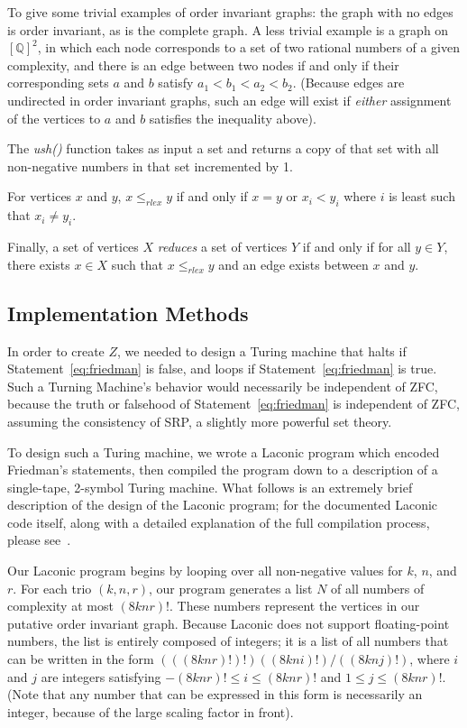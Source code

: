 \documentclass[11pt]{article}
\begin{document}
To give some trivial examples of order invariant graphs: the graph with no edges is order invariant, as is the complete graph. A less trivial example is a graph on $[\mathbb{Q}]^2$, in which each node corresponds to a set of two rational numbers of a given complexity, and there is an edge between two nodes if and only if their corresponding sets $a$ and $b$ satisfy $a_1 < b_1 < a_2 < b_2$. (Because edges are undirected in order invariant graphs, such an edge will exist if \emph{either} assignment of the vertices to $a$ and $b$ satisfies the inequality above). 

The \emph{ush()} function takes as input a set and returns a copy of that set with all non-negative numbers in that set incremented by 1. 

For vertices $x$ and $y$, $x \le_{rlex} y$ if and only if $x = y$ or $x_i < y_i$ where $i$ is least such that $x_i \not= y_i$.

Finally, a set of vertices $X$ \emph{reduces} a set of vertices $Y$ if and only if for all $y \in Y$, there exists $x \in X$ such that $x \le_{rlex} y$ and an edge exists between $x$ and $y$. 

\subsection{Implementation Methods}

In order to create $Z$, we needed to design a Turing machine that halts if Statement~\ref{eq:friedman} is false, and loops if Statement~\ref{eq:friedman} is true. Such a Turning Machine's behavior would necessarily be independent of ZFC, because the truth or falsehood of Statement~\ref{eq:friedman} is independent of ZFC, assuming the consistency of SRP, a slightly more powerful set theory.~\cite{friedman} 

To design such a Turing machine, we wrote a Laconic program which encoded Friedman's statements, then compiled the program down to a description of a single-tape, 2-symbol Turing machine. What follows is an extremely brief description of the design of the Laconic program; for the documented Laconic code itself, along with a detailed explanation of the full compilation process, please see~\cite{github}. 

Our Laconic program begins by looping over all non-negative values for $k$, $n$, and $r$. For each trio $(k, n, r)$, our program generates a list $N$ of all numbers of complexity at most $(8knr)!$. These numbers represent the vertices in our putative order invariant graph. Because Laconic does not support floating-point numbers, the list is entirely composed of integers; it is a list of all numbers that can be written in the form $(((8knr)!)!)((8kni)!)/((8knj)!)$, where $i$ and $j$ are integers satisfying $-(8knr)! \le i \le (8knr)!$ and $1 \le j \le (8knr)!$. (Note that any number that can be expressed in this form is necessarily an integer, because of the large scaling factor in front). 
\end{document}
